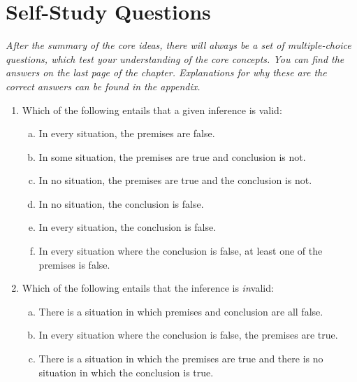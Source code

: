 \section{Self-Study Questions}

\emph{After the summary of the core ideas, there will always be a set of multiple-choice questions, which test your understanding of the core concepts. You can find the answers on the last page of the chapter. Explanations for why these are the correct answers can be found in the appendix.}

	\begin{enumerate}[\thesection.1]
	
		\item Which of the following entails that a given inference is valid:
		
			\begin{enumerate}[(a)]
				
				\item In every situation, the premises are false.
				
				\item In some situation, the premises are true and conclusion is not.
				
				\item In no situation, the premises are true and the conclusion is not.
				
				\item In no situation, the conclusion is false.
				
				\item In every situation, the conclusion is false.
				
				\item In every situation where the conclusion is false, at least one of the premises is false.

			\end{enumerate}

		\item Which of the following entails that the inference is \emph{in}valid:
		
			\begin{enumerate}[(a)]
			
				\item There is a situation in which premises and conclusion are  all false.
				
				\item In every situation where the conclusion is false, the premises are true.

				\item There is a situation in which the premises are true and there is no situation in which the conclusion is true.
				

\end{enumerate}
\end{enumerate}
